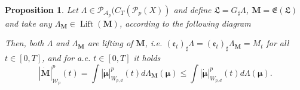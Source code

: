 \documentclass[10pt,leqno]{amsart}
\numberwithin{equation}{section}
\newtheorem{prop}[teorema]{Proposition}
\newcommand{\PP}{\mathcal{P}}
\begin{document}
\begin{prop}\label{starting from Lambda}
    Let $\Lambda \in \PP_{\mathcal{A}_p}\big(C_T(\PP_p(X))$ and define $\mathfrak{L} = G_\sharp \Lambda$, $\boldsymbol{M} = \mathfrak{E}(\mathfrak{L})$ and take any $\Lambda_{\boldsymbol{M}} \in \operatorname{Lift}(\boldsymbol{M})$, according to the following diagram
    \begin{center}
    \color{black}
    \normalcolor
    \end{center}
  Then, both $\Lambda $ and $\Lambda_{\boldsymbol{M}}$ are lifting of $\boldsymbol{M}$, i.e. $(\mathfrak{e}_t)_\sharp \Lambda = (\mathfrak{e}_t)_\sharp \Lambda_{\boldsymbol{M}} = M_t$ for all $t\in [0,T]$, and for a.e. $t\in [0,T]$ it holds
    \begin{equation}
        |\dot{\boldsymbol{M}}|_{\mathcal{W}_p}^p(t) = \int |\dot{\boldsymbol{\mu}}|_{W_{p,d}}^p(t) d\Lambda_{\boldsymbol{M}}(\boldsymbol{\mu}) \leq \int |\dot{\boldsymbol{\mu}}|_{W_{p,d}}^p(t) d\Lambda(\boldsymbol{\mu}).
    \end{equation}
\end{prop}
\end{document}

